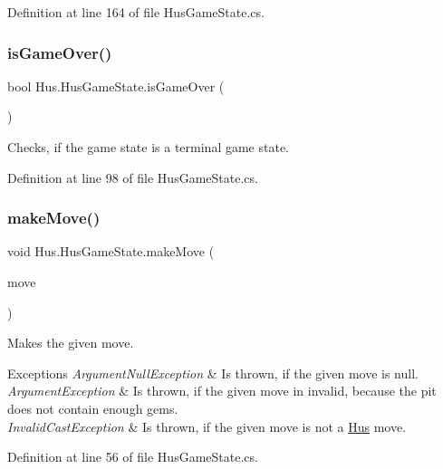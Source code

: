 Definition at line 164 of file Hus\+Game\+State.\+cs.

\mbox{\label{class_hus_1_1_hus_game_state_a9b64d987dbc11c7b6d7035eb9613c633}} 
\subsubsection{\texorpdfstring{is\+Game\+Over()}{isGameOver()}}
{\footnotesize\ttfamily bool Hus.\+Hus\+Game\+State.\+is\+Game\+Over (\begin{DoxyParamCaption}{ }\end{DoxyParamCaption})}



Checks, if the game state is a terminal game state. 



Definition at line 98 of file Hus\+Game\+State.\+cs.

\mbox{\label{class_hus_1_1_hus_game_state_a32512f6800dd87707960a5d8ba230abd}} 
\subsubsection{\texorpdfstring{make\+Move()}{makeMove()}}
{\footnotesize\ttfamily void Hus.\+Hus\+Game\+State.\+make\+Move (\begin{DoxyParamCaption}\item[{I\+Move}]{move }\end{DoxyParamCaption})}



Makes the given move. 


\begin{DoxyExceptions}{Exceptions}
{\em Argument\+Null\+Exception} & Is thrown, if the given move is null.\\
\hline
{\em Argument\+Exception} & Is thrown, if the given move in invalid, because the pit does not contain enough gems.\\
\hline
{\em Invalid\+Cast\+Exception} & Is thrown, if the given move is not a \mbox{\hyperlink{namespace_hus}{Hus}} move.\\
\hline
\end{DoxyExceptions}


Definition at line 56 of file Hus\+Game\+State.\+cs.

